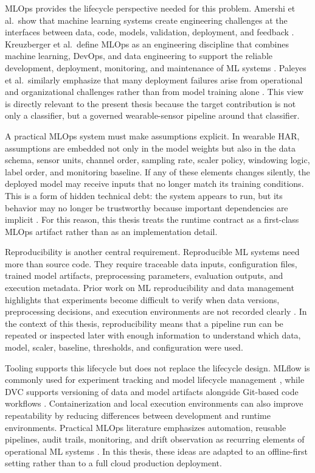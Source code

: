 MLOps provides the lifecycle perspective needed for this problem. Amershi et al.\ show that machine learning systems create engineering challenges at the interfaces between data, code, models, validation, deployment, and feedback \cite{amershi2019mlops}. Kreuzberger et al.\ define MLOps as an engineering discipline that combines machine learning, DevOps, and data engineering to support the reliable development, deployment, monitoring, and maintenance of ML systems \cite{kreuzberger2023mlops}. Paleyes et al.\ similarly emphasize that many deployment failures arise from operational and organizational challenges rather than from model training alone \cite{paleyes2022challenges}. This view is directly relevant to the present thesis because the target contribution is not only a classifier, but a governed wearable-sensor pipeline around that classifier.

A practical MLOps system must make assumptions explicit. In wearable HAR, assumptions are embedded not only in the model weights but also in the data schema, sensor units, channel order, sampling rate, scaler policy, windowing logic, label order, and monitoring baseline. If any of these elements changes silently, the deployed model may receive inputs that no longer match its training conditions. This is a form of hidden technical debt: the system appears to run, but its behavior may no longer be trustworthy because important dependencies are implicit \cite{sculley2015debt}. For this reason, this thesis treats the runtime contract as a first-class MLOps artifact rather than as an implementation detail.

Reproducibility is another central requirement. Reproducible ML systems need more than source code. They require traceable data inputs, configuration files, trained model artifacts, preprocessing parameters, evaluation outputs, and execution metadata. Prior work on ML reproducibility and data management highlights that experiments become difficult to verify when data versions, preprocessing decisions, and execution environments are not recorded clearly \cite{gardner2018enabling,bahaidarah2021reusable,munappy2019data}. In the context of this thesis, reproducibility means that a pipeline run can be repeated or inspected later with enough information to understand which data, model, scaler, baseline, thresholds, and configuration were used.

Tooling supports this lifecycle but does not replace the lifecycle design. MLflow is commonly used for experiment tracking and model lifecycle management \cite{zaharia2018mlflow}, while DVC supports versioning of data and model artifacts alongside Git-based code workflows \cite{kuprieiev2023dvc}. Containerization and local execution environments can also improve repeatability by reducing differences between development and runtime environments. Practical MLOps literature emphasizes automation, reusable pipelines, audit trails, monitoring, and drift observation as recurring elements of operational ML systems \cite{gift2021practicalmlops}. In this thesis, these ideas are adapted to an offline-first setting rather than to a full cloud production deployment.

